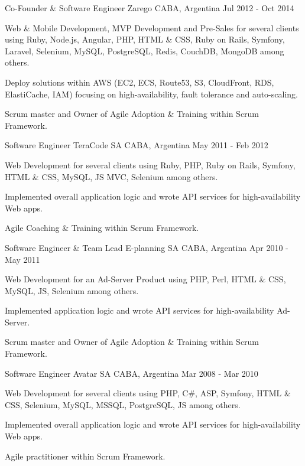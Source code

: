 \begin{cventries}
  \cventry
    {Co-Founder \& Software Engineer}
    {Zarego}
    {CABA, Argentina}
    {Jul 2012 - Oct 2014}
    {
      \begin{cvitems}
        \item {Web \& Mobile Development, MVP Development and Pre-Sales for several clients using Ruby, Node.js, Angular, PHP, HTML \& CSS, Ruby on Rails, Symfony, Laravel, Selenium, MySQL, PostgreSQL, Redis, CouchDB, MongoDB  among others.}
        \item {Deploy solutions within AWS (EC2, ECS, Route53, S3, CloudFront, RDS, ElastiCache, IAM) focusing on high-availability, fault tolerance and auto-scaling.}
		\item {Scrum master and Owner of Agile Adoption \& Training within Scrum Framework.}
      \end{cvitems}
    }

  \cventry
    {Software Engineer}
    {TeraCode SA}
    {CABA, Argentina}
    {May 2011 - Feb 2012}
    {
      \begin{cvitems}
        \item {Web Development for several clients using Ruby, PHP, Ruby on Rails, Symfony, HTML \& CSS, MySQL, JS MVC, Selenium among others.}
        \item {Implemented overall application logic and wrote API services for high-availability Web apps.}
        \item {Agile Coaching \& Training within Scrum Framework.}
      \end{cvitems}
    }
   
  \cventry
    {Software Engineer \& Team Lead}
    {E-planning SA}
    {CABA, Argentina}
    {Apr 2010 - May 2011}
    {
      \begin{cvitems}
        \item {Web Development for an Ad-Server Product using PHP, Perl, HTML \& CSS, MySQL, JS, Selenium among others.}
        \item {Implemented application logic and wrote API services for high-availability Ad-Server.}
        \item {Scrum master and Owner of Agile Adoption \& Training within Scrum Framework.}
      \end{cvitems}
    } 
   
  \cventry
    {Software Engineer}
    {Avatar SA}
    {CABA, Argentina}
    {Mar 2008 - Mar 2010}
    {
      \begin{cvitems}
        \item {Web Development for several clients using PHP, C\#, ASP, Symfony, HTML \& CSS, Selenium, MySQL, MSSQL, PostgreSQL, JS among others.}
        \item {Implemented overall application logic and wrote API services for high-availability Web apps.}
        \item {Agile practitioner within Scrum Framework.}
      \end{cvitems}
    } 
      

\end{cventries}
